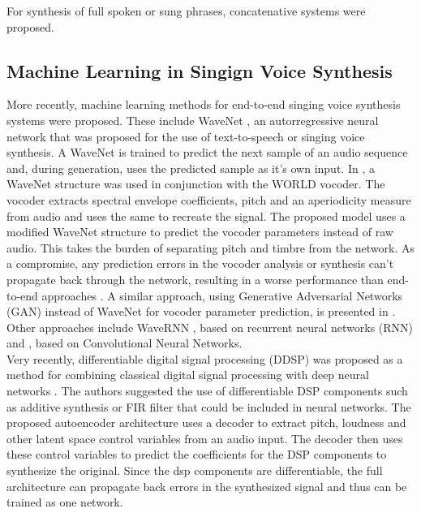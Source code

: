 \documentclass{article}
\begin{document}
For synthesis of full spoken or sung phrases, concatenative systems \cite{schwarz_concatenative_2006} were proposed. 

\subsection{Machine Learning in Singign Voice Synthesis}

More recently, machine learning methods for end-to-end singing voice synthesis systems were proposed. These include WaveNet \cite{oord_wavenet:_2016}, an autorregressive neural network that was proposed for the use of text-to-speech or singing voice synthesis. A WaveNet is trained to predict the next sample of an audio sequence and, during generation, uses the predicted sample as it's own input. In \cite{blaauw_neural_2017}, a WaveNet structure was used in conjunction with the WORLD vocoder\cite{morise_world:_2016}. The vocoder extracts spectral envelope coefficients, pitch and an aperiodicity measure from audio and uses the same to recreate the signal. The proposed model uses a modified WaveNet structure to predict the vocoder parameters instead of raw audio. This takes the burden of separating pitch and timbre from the network. As a compromise, any prediction errors in the vocoder analysis or synthesis can't propagate back through the network, resulting in a worse performance than end-to-end approaches \cite{engel_ddsp:_2020}. A similar approach, using Generative Adversarial Networks (GAN) instead of WaveNet for vocoder parameter prediction, is presented in \cite{chandna_wgansing:_2019}. Other approaches include WaveRNN \cite{kalchbrenner_efficient_2018}, based on recurrent neural networks (RNN) and \cite{nakamura_singing_2019}, based on Convolutional Neural Networks.\\

Very recently, differentiable digital signal processing (DDSP) was proposed as a method for combining classical digital signal processing with deep neural networks \cite{engel_ddsp:_2020}. The authors suggested the use of differentiable DSP components such as additive synthesis or FIR filter that could be included in neural networks. The proposed autoencoder architecture uses a decoder to extract pitch, loudness and other latent space control variables from an audio input. The decoder then uses these control variables to predict the coefficients for the DSP components to synthesize the original. Since the dsp components are differentiable, the full architecture can propagate back errors in the synthesized signal and thus can be trained as one network. 
\end{document}
